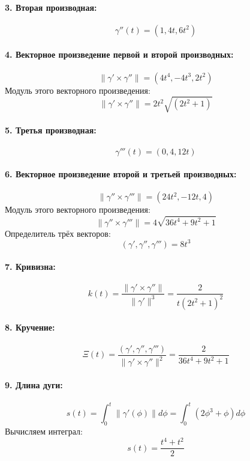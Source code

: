 \documentclass{article}
\begin{document}
        \paragraph{3. Вторая производная:}
        \[
        \gamma''(t) = \left(1, 4t, 6t^2\right)
        \]
        
        \paragraph{4. Векторное произведение первой и второй производных:}
        \[
        \|\gamma' \times \gamma''\| = \left(4t^4, -4t^3, 2t^2\right)
        \]
        Модуль этого векторного произведения:
        \[
        \|\gamma' \times \gamma''\| = 2t^2 \sqrt{(2t^2 + 1)}
        \]
        
        \paragraph{5. Третья производная:}
        \[
        \gamma'''(t) = \left(0, 4, 12t\right)
        \]
        
        \paragraph{6. Векторное произведение второй и третьей производных:}
        \[
        \|\gamma'' \times \gamma'''\| = \left(24t^2, -12t, 4\right)
        \]
        Модуль этого векторного произведения:
        \[
        \|\gamma'' \times \gamma'''\| = 4\sqrt{36t^4 + 9t^2 + 1}
        \]
        Определитель трёх векторов:
        \[
        (\gamma', \gamma'', \gamma''') = 8t^3
        \]
        
        \paragraph{7. Кривизна:}
        \[
        k(t) = \frac{\|\gamma' \times \gamma''\|}{\|\gamma'\|^3} = \frac{2}{t(2t^2 + 1)^2}
        \]
        
        \paragraph{8. Кручение:}
        \[
        \Xi(t) = \frac{(\gamma', \gamma'', \gamma''')}{\|\gamma' \times \gamma''\|^2} = \frac{2}{36t^4 + 9t^2 + 1}
        \]
        
        \paragraph{9. Длина дуги:}
        \[
        s(t) = \int_{0}^{t} \|\gamma'(\phi)\| d\phi = \int_{0}^{t} \left(2\phi^3 + \phi\right) d\phi
        \]
        Вычисляем интеграл:
        \[
        s(t) = \frac{t^4 + t^2}{2}
        \]
        
\end{document}
